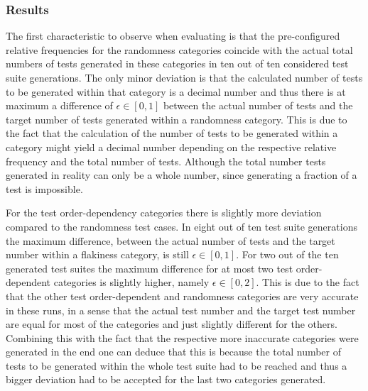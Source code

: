 \documentclass[
fancyheadings, %
%
%
]{stsreprt}
\begin{document}
\subsubsection{Results}
The first characteristic to observe when evaluating is that the pre-configured relative frequencies for the randomness categories coincide with the actual total numbers of tests generated in these categories in ten out of ten considered test suite generations. The only minor deviation is that the calculated number of tests to be generated within that category is a decimal number and thus there is at maximum a difference of $\epsilon \in [0,1]$ between the actual number of tests and the target number of tests generated within a randomness category. This is due to the fact that the calculation of the number of tests to be generated within a category might yield a decimal number depending on the respective relative frequency and the total number of tests. 
Although the total number tests generated in reality can only be a whole number, since generating a fraction of a test is impossible. \par
For the test order-dependency categories there is slightly more deviation compared to the randomness test cases. In eight out of ten test suite generations the maximum difference, between the actual number of tests and the target number within a flakiness category, is still $\epsilon \in [0,1]$. For two out of the ten generated test suites the maximum difference for at most two test order-dependent categories is slightly higher, namely $\epsilon \in [0,2]$. This is due to the fact that the other test order-dependent and randomness categories are very accurate in these runs, in a sense that the actual test number and the target test number are equal for most of the categories and just slightly different for the others. Combining this with the fact that the respective more inaccurate categories were generated in the end one can deduce that this is because the total number of tests to be generated within the whole test suite had to be reached and thus a bigger deviation had to be accepted for the last two categories generated.
\end{document}
